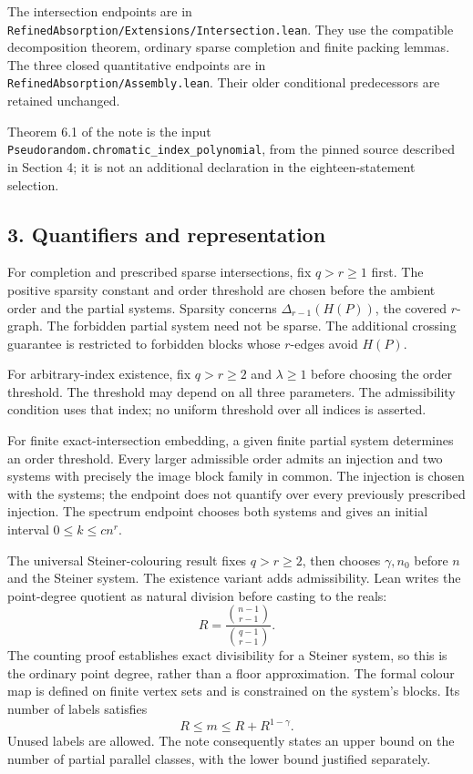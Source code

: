 \documentclass[english,11pt,a4paper]{article}
\begin{document}
The intersection endpoints are in \texttt{Refined\allowbreak{}Absorption/\allowbreak{}Extensions/\allowbreak{}Intersection.\allowbreak{}lean}. They use the compatible decomposition theorem, ordinary sparse completion and finite packing lemmas. The three closed quantitative endpoints are in \texttt{Refined\allowbreak{}Absorption/\allowbreak{}Assembly.\allowbreak{}lean}. Their older conditional predecessors are retained unchanged.

Theorem 6.1 of the note is the input \texttt{Pseudorandom.\allowbreak{}chromatic\_\allowbreak{}index\_\allowbreak{}polynomial}, from the pinned source described in Section 4; it is not an additional declaration in the eighteen-statement selection.

\subsection{3. Quantifiers and representation}\label{quantifiers-and-representation}

For completion and prescribed sparse intersections, fix \(q>r\ge1\) first. The positive sparsity constant and order threshold are chosen before the ambient order and the partial systems. Sparsity concerns \(\Delta_{r-1}(H(P))\), the covered \(r\)-graph. The forbidden partial system need not be sparse. The additional crossing guarantee is restricted to forbidden blocks whose \(r\)-edges avoid \(H(P)\).

For arbitrary-index existence, fix \(q>r\ge2\) and \(\lambda\ge1\) before choosing the order threshold. The threshold may depend on all three parameters. The admissibility condition uses that index; no uniform threshold over all indices is asserted.

For finite exact-intersection embedding, a given finite partial system determines an order threshold. Every larger admissible order admits an injection and two systems with precisely the image block family in common. The injection is chosen with the systems; the endpoint does not quantify over every previously prescribed injection. The spectrum endpoint chooses both systems and gives an initial interval \(0\le k\le c n^r\).

The universal Steiner-colouring result fixes \(q>r\ge2\), then chooses \(\gamma,n_0\) before \(n\) and the Steiner system. The existence variant adds admissibility. Lean writes the point-degree quotient as natural division before casting to the reals: \[R=\frac{\binom{n-1}{r-1}}{\binom{q-1}{r-1}}.\] The counting proof establishes exact divisibility for a Steiner system, so this is the ordinary point degree, rather than a floor approximation. The formal colour map is defined on finite vertex sets and is constrained on the system's blocks. Its number of labels satisfies \[R\le m\le R+R^{1-\gamma}.\] Unused labels are allowed. The note consequently states an upper bound on the number of partial parallel classes, with the lower bound justified separately.
\end{document}
